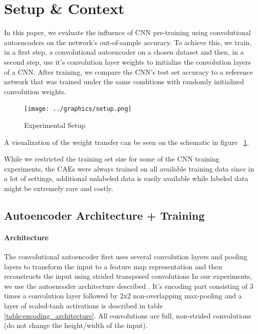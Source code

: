 \documentclass{article}
\begin{document}
\section{Setup \& Context}

  In this paper, we evaluate the influence of CNN pre-training using convolutional autoencoders on the network's out-of-sample accuracy. To achieve this, we train, in a first step, a convolutional autoencoder on a chosen dataset and then, in a second step, use it's convolution layer weights to initialize the convolution layers of a CNN. After training, we compare the CNN's test set accuracy to a reference network that was trained under the same conditions with randomly initialized convolution weights. 

  \begin{figure}[h]
    \centering
    \texttt{[image: ../graphics/setup.png]}
    \caption{Experimental Setup}
    \label{fig:experimental_setup}
  \end{figure}

  A visualization of the weight transfer can be seen on the schematic in figure ~\ref{fig:experimental_setup}. 

  While we restricted the training set size for some of the CNN training experiments, the CAEs were always trained on all available training data since in a lot of settings, additional unlabeled data is easily available while labeled data might be extremely rare and costly.  

  \subsection{Autoencoder Architecture + Training}

    \paragraph{Architecture}
    The convolutional autoencoder first uses several convolution layers and pooling layers to transform the input to a feature map representation and then reconstructs the input using strided transposed convolutions 
    In our experiments, we use the autoencoder architecture described \citep{TODO:add_stacked_conv_citation}. It's encoding part consisting of 3 times a convolution layer followed by 2x2 non-overlapping max-pooling and a layer of scaled-tanh activations is described in table \ref{table:encoding_architecture}. All convolutions are full, non-strided convolutions (do not change the height/width of the input). 
\end{document}

